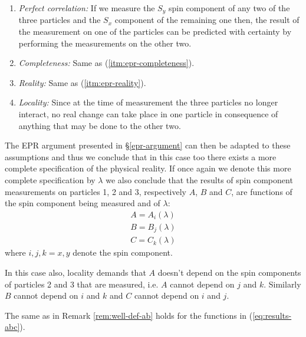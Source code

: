 \begin{enumerate}[label=(\alph*$'$)]
\item \label{itm:epr-perfect-correlation'} \textit{Perfect correlation:} If we measure the $S_y$ spin component of any two of the three particles and the $S_x$ component of the remaining one then, the result of the measurement on one of the particles can be predicted with certainty by performing the measurements on the other two.
\item \label{itm:epr-completeness'} \textit{Completeness:} Same as (\ref{itm:epr-completeness}).
\item \label{itm:epr-reality'} \textit{Reality:} Same as (\ref{itm:epr-reality}).
\item \label{itm:epr-locality'} \textit{Locality:} Since at the time of measurement the three particles no longer interact, no real change can take place in one particle in consequence of anything that may be done to the other two.
\end{enumerate}
The EPR argument presented in \S \ref{epr-argument} can then be adapted to these assumptions and thus we conclude that in this case too there exists a more complete specification of the physical reality. If once again we denote this more complete specification by $\lambda$ we also conclude that the results of spin component measurements on particles 1, 2 and 3, respectively $A$, $B$ and $C$, are functions of the spin component being measured and of $\lambda$:%
\begin{equation}
  \label{eq:results-abc}
  \begin{split}
      A = A_i(\lambda)\\
      B = B_j(\lambda)\\
      C = C_k(\lambda)
  \end{split}
\end{equation}
where $i, j, k = x, y$ denote the spin component.%

In this case also, locality demands that $A$ doesn't depend on the spin components of particles 2 and 3 that are measured, i.e. $A$ cannot depend on $j$ and $k$. Similarly $B$ cannot depend on $i$ and $k$ and $C$ cannot depend on $i$ and $j$.

\begin{remark}
  \label{rem:well-def-abc}
  The same as in Remark \ref{rem:well-def-ab} holds for the functions in (\ref{eq:results-abc}).
\end{remark}


